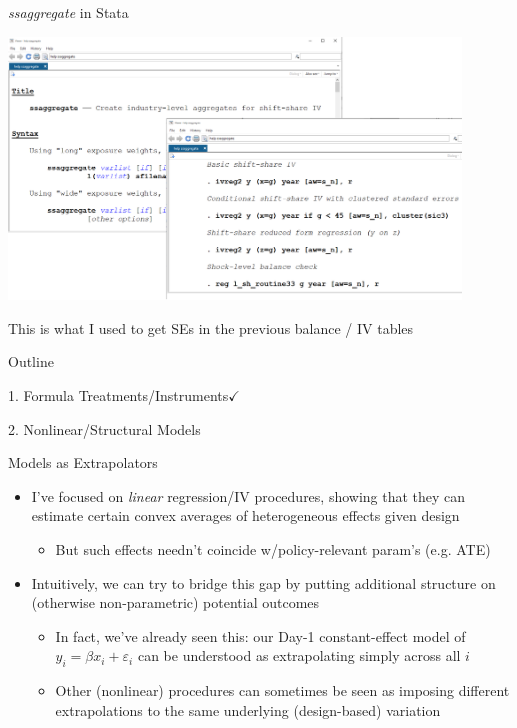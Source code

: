 \documentclass[11pt,english]{beamer}
\begin{document}
\begin{frame}{\emph{ssaggregate} in Stata}

\begin{center}
	\includegraphics[width=0.9\textwidth]{figures/ssaggregate.png}
\end{center}
This is what I used to get SEs in the previous balance / IV tables

\end{frame}


\begin{frame}{Outline}

\textcolor{red!75!green!50!blue!25!gray}{1. Formula Treatments/Instruments}$\checkmark$
\vspace{0.8cm}

2. Nonlinear/Structural Models

\end{frame}

\begin{frame}{Models as Extrapolators}
\begin{itemize}
\item I've focused on \emph{linear} regression/IV procedures, showing that they can estimate certain convex averages of heterogeneous effects given design\smallskip\pause
\begin{itemize}
\item But such effects needn't coincide w/policy-relevant param's (e.g. ATE)
\end{itemize}\bigskip\pause{}
\item Intuitively, we can try to bridge this gap by putting additional structure on (otherwise non-parametric) potential outcomes\smallskip\pause{}
\begin{itemize}
\item In fact, we've already seen this: our Day-1 constant-effect model of $y_i=\beta x_i+\varepsilon_i$ can be understood as extrapolating simply across all $i$\smallskip\pause{}
\item Other (nonlinear) procedures can sometimes be seen as imposing different extrapolations to the same underlying (design-based) variation
\end{itemize}
\end{itemize}
\end{frame}
\end{document}
